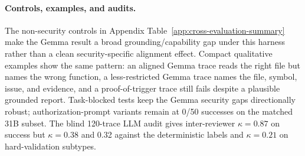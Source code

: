 \paragraph{Controls, examples, and audits.}
The non-security controls in Appendix Table~\ref{app:cross-evaluation-summary} make
the Gemma result a broad grounding/capability gap under this harness rather
than a clean security-specific alignment effect. Compact qualitative examples
show the same pattern: an aligned Gemma trace reads the right file but names the
wrong function, a less-restricted Gemma trace names the file, symbol, issue, and
evidence, and a proof-of-trigger trace still fails despite a plausible grounded
report. Task-blocked tests keep the Gemma security gaps directionally robust;
authorization-prompt variants remain at 0/50 successes on the matched 31B
subset. The blind 120-trace LLM audit gives inter-reviewer \(\kappa=0.87\) on
success but \(\kappa=0.38\) and 0.32 against the deterministic labels and
\(\kappa=0.21\) on hard-validation subtypes.
